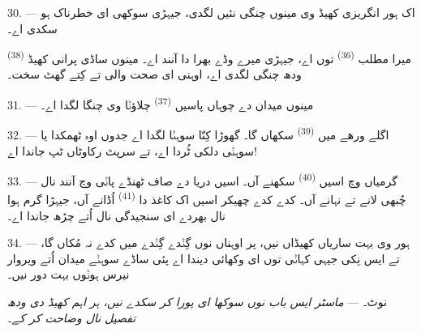 30. --- اک ہور انگریزی کھیڈ وی مینوں چنگی نئیں لگدی، جیہڑی سوکھی ای خطرناک ہو
سکدی اے۔

میرا مطلب  \textsuperscript{(36)} توں اے، جیہڑی میرے وڈے بھرا دا
آنند اے۔ مینوں ساڈی پرانی کھیڈ  \textsuperscript{(38)} ودھ چنگی
لگدی اے، اوہنی ای صحت والی تے کِتے گھٹ سخت۔

\VUsaut{4.6mm}
\VUsaut{3.0mm}

31. --- مینوں میدان دے چوہاں پاسیں  \textsuperscript{(37)} چلاؤݨا
وی چنگا لگدا اے۔

32. --- اگلے ورھے میں  \textsuperscript{(39)} سکھاں گا۔ گھوڑا
کِنّا سوہݨا لگدا اے جدوں اوہ ٹھمکدا یا سوہݨی دلکی ٹُردا اے، تے سرپٹ رکاوٹاں
ٹپ جاندا اے!

33. --- گرمیاں وچ اسیں  \textsuperscript{(40)} سکھنے آں۔ اسیں دریا
دے صاف ٹھنڈے پاݨی وچ آنند نال چُبھی لانے تے نہانے آں۔ کدے کدے چھیکر اسیں اک
کاغذ دا  \textsuperscript{(41)} اُڈانے آں، جیہڑا گرم ہوا نال بھردے
ای سنجیدگی نال اُتے چڑھ جاندا اے۔

34. --- ہور وی بہت ساریاں کھیڈاں نیں، پر اوہناں نوں گِݨدے گِݨدے میں کدے نہ
مُکاں گا، تے ایس نِکی جیہی کہاݨی توں ای وکھائی دیندا اے پئی ساڈے سوہݨے میدان
اُتے ویروار نیرس ہوݨوں بہت دور نیں۔

نوٹ۔ --- \textit{ماسٹر ایس باب نوں سوکھا ای پورا کر سکدے نیں، ہر اہم کھیڈ دی
ودھ تفصیل نال وضاحت کر کے۔}
\VUsaut{6.0mm}
\VUfilet{22mm}
